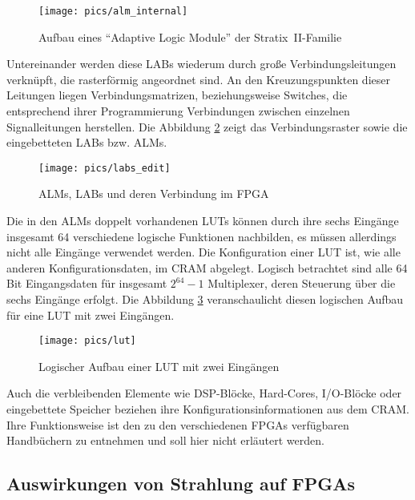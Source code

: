 \begin{figure}[htbp]
	\centering
	\texttt{[image: pics/alm\_internal]}
	\caption[Aufbau eines ``Adaptive Logic Module'' der
          Stratix\TReg\ II-Familie]{Aufbau eines ``Adaptive Logic Module'' der Stratix\TReg\ II-Familie \cite[S. 2-7]{stratixhandbook09}}
	\label{fig:grundlagen_fpgas_alm}
\end{figure}

Untereinander werden diese LABs wiederum durch große
Verbindungsleitungen verknüpft, die rasterförmig angeordnet sind. An
den Kreuzungspunkten dieser Leitungen liegen Verbindungsmatrizen,
beziehungsweise Switches, die entsprechend ihrer Programmierung
Verbindungen zwischen einzelnen Signalleitungen herstellen. 
Die Abbildung \ref{fig:grundlagen_fpgas_labs} zeigt das
Verbindungsraster sowie die eingebetteten LABs bzw. ALMs.

\begin{figure}[htbp]
	\centering
	\texttt{[image: pics/labs\_edit]}
	\caption{ALMs, LABs und deren Verbindung im FPGA }
	\label{fig:grundlagen_fpgas_labs}
\end{figure}

Die in den ALMs doppelt vorhandenen LUTs können durch ihre sechs
Eingänge insgesamt 64 verschiedene logische Funktionen nachbilden, es
müssen allerdings nicht alle Eingänge verwendet werden. Die
Konfiguration einer LUT ist, wie alle anderen Konfigurationsdaten, im
CRAM abgelegt. Logisch betrachtet sind alle 64 Bit Eingangsdaten für
insgesamt $2^{64}-1$ Multiplexer, deren Steuerung über die sechs
Eingänge erfolgt. Die Abbildung \ref{fig:grundlagen_fpgas_lut}
veranschaulicht diesen logischen Aufbau für eine LUT mit zwei
Eingängen.

\begin{figure}[htbp]
	\centering
	\texttt{[image: pics/lut]}
	\caption{Logischer Aufbau einer LUT mit zwei Eingängen}
	\label{fig:grundlagen_fpgas_lut}
\end{figure}

Auch die verbleibenden Elemente wie DSP-Blöcke, Hard-Cores,
I/O-Blöcke oder eingebettete Speicher beziehen ihre
Konfigurationsinformationen aus dem CRAM. Ihre Funktionsweise ist den
zu den verschiedenen FPGAs verfügbaren Handbüchern zu entnehmen und
soll hier nicht erläutert werden.

\subsection{Auswirkungen von Strahlung auf FPGAs}
\label{sec:fpga_seu}


